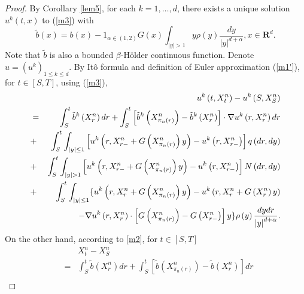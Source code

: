\documentclass[11pt]{amsart}
\theoremstyle{plain}
\numberwithin{equation}{section}
\begin{document}
\begin{proof}
By Corollary \ref{lem5}, for each $k=1,\ldots ,d$, there exists a unique
solution $u^{k}\left( t,x\right) $ to (\ref{m3}) with\begin{equation*}
\tilde{b}\left( x\right) =b\left( x\right) -1_{\alpha \in \left( 1,2\right)
}G\left( x\right) \int_{\left\vert y\right\vert >1}y\rho \left( y\right) 
\frac{dy}{\left\vert y\right\vert ^{d+\alpha }},x\in \mathbf{R}^{d}.
\end{equation*}Note that $\tilde{b}$ is also a bounded $\beta $-H\"{o}lder continuous
function. Denote $u=\left( u^{k}\right) _{1\leq k\leq d}$. By It\^{o}
formula and definition of Euler approximation (\ref{m1'}), for $t\in \left[
S,T\right] $, using (\ref{m3}), 
\begin{eqnarray}
&&u^{k}\left( t,X_{t}^{n}\right) -u^{k}\left( S,X_{S}^{n}\right)  \notag \\
&=&\int_{S}^{t}\tilde{b}^{k}\left( X_{r}^{n}\right) dr+\int_{S}^{t}\left[ 
\tilde{b}^{k}\left( X_{\pi _{n}\left( r\right) }^{n}\right) -\tilde{b}^{k}\left( X_{r}^{n}\right) \right] \cdot \nabla u^{k}\left(
r,X_{r}^{n}\right) dr  \notag \\
&+&\int_{S}^{t}\int_{\left\vert y\right\vert \leq 1}\left[ u^{k}\left(
r,X_{r-}^{n}+G\left( X_{\pi _{n}\left( r\right) }^{n}\right) y\right)
-u^{k}\left( r,X_{r-}^{n}\right) \right] q\left( dr,dy\right)  \notag \\
&+&\int_{S}^{t}\int_{\left\vert y\right\vert >1}\left[ u^{k}\left(
r,X_{r-}^{n}+G\left( X_{\pi _{n}\left( r\right) }^{n}\right) y\right)
-u^{k}\left( r,X_{r-}^{n}\right) \right] N\left( dr,dy\right)  \notag \\
&+&\int_{S}^{t}\int_{\left\vert y\right\vert \leq 1}\{u^{k}\left(
r,X_{r}^{n}+G\left( X_{\pi _{n}\left( r\right) }^{n}\right) y\right)
-u^{k}\left( r,X_{r}^{n}+G\left( X_{r}^{n}\right) y\right)  \notag \\
&&\quad -\nabla u^{k}\left( r,X_{r}^{n}\right) \cdot \left[ G\left( X_{\pi
_{n}\left( r\right) }^{n}\right) -G\left( X_{r-}^{n}\right) \right] y\}\rho
\left( y\right) \frac{dydr}{\left\vert y\right\vert ^{d+\alpha }}.  \notag
\end{eqnarray}On the other hand, according to \eqref{m2}, for $t\in \left[ S,T\right] $ 
\begin{eqnarray*}
&&X_{t}^{n}-X_{S}^{n} \\
&=&\int_{S}^{t}\tilde{b}\left( X_{r}^{n}\right) dr+\int_{S}^{t}\left[ \tilde{b}\left( X_{\pi _{n}\left( r\right) }^{n}\right) -\tilde{b}\left(
X_{r}^{n}\right) \right] dr \\

\end{eqnarray*}
\end{proof}
\end{document}
